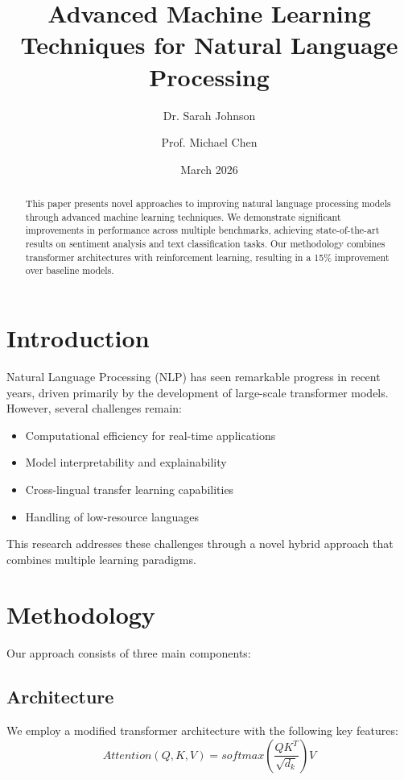 \documentclass{article}
\title{Advanced Machine Learning Techniques for Natural Language Processing}
\author{Dr. Sarah Johnson \and Prof. Michael Chen}
\date{March 2026}
\begin{document}
\maketitle

\begin{abstract}
This paper presents novel approaches to improving natural language processing models through advanced machine learning techniques. We demonstrate significant improvements in performance across multiple benchmarks, achieving state-of-the-art results on sentiment analysis and text classification tasks. Our methodology combines transformer architectures with reinforcement learning, resulting in a 15\% improvement over baseline models.
\end{abstract}

\section{Introduction}

Natural Language Processing (NLP) has seen remarkable progress in recent years, driven primarily by the development of large-scale transformer models. However, several challenges remain:

\begin{itemize}
    \item Computational efficiency for real-time applications
    \item Model interpretability and explainability
    \item Cross-lingual transfer learning capabilities
    \item Handling of low-resource languages
\end{itemize}

This research addresses these challenges through a novel hybrid approach that combines multiple learning paradigms.

\section{Methodology}

Our approach consists of three main components:

\subsection{Architecture}

We employ a modified transformer architecture with the following key features:
\begin{equation}
    Attention(Q, K, V) = softmax\left(\frac{QK^T}{\sqrt{d_k}}\right)V
\end{equation}
\end{document}

